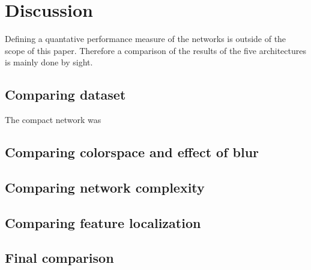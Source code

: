 \section{Discussion}

Defining a quantative performance measure of the networks is outside of the scope of this paper. Therefore a comparison of the results of the five architectures is mainly done by sight.

\subsection{Comparing dataset}
The compact network was


\subsection{Comparing colorspace and effect of blur}

\subsection{Comparing network complexity}

\subsection{Comparing feature localization}

\subsection{Final comparison}








